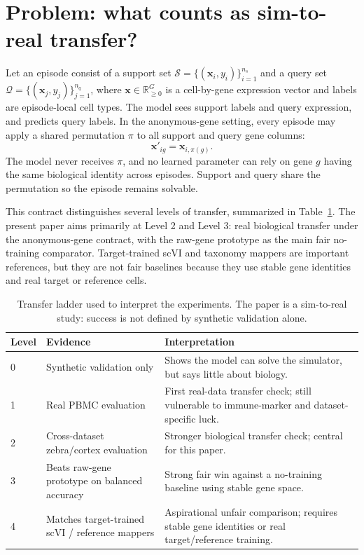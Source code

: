 \documentclass{article}
\newcommand{\R}{\mathbb{R}}
\begin{document}
\section{Problem: what counts as sim-to-real transfer?}

Let an episode consist of a support set \(\mathcal{S}=\{(\mathbf{x}_i,y_i)\}_{i=1}^{n_s}\) and a query set \(\mathcal{Q}=\{(\mathbf{x}_j,y_j)\}_{j=1}^{n_q}\), where \(\mathbf{x}\in\R_{\ge 0}^{G}\) is a cell-by-gene expression vector and labels are episode-local cell types. The model sees support labels and query expression, and predicts query labels. In the anonymous-gene setting, every episode may apply a shared permutation \(\pi\) to all support and query gene columns:
\begin{equation}
    \mathbf{x}'_{ig}=\mathbf{x}_{i,\pi(g)}.
\end{equation}
The model never receives \(\pi\), and no learned parameter can rely on gene \(g\) having the same biological identity across episodes. Support and query share the permutation so the episode remains solvable.

This contract distinguishes several levels of transfer, summarized in Table~\ref{tab:transfer_ladder}. The present paper aims primarily at Level 2 and Level 3: real biological transfer under the anonymous-gene contract, with the raw-gene prototype as the main fair no-training comparator. Target-trained scVI and taxonomy mappers are important references, but they are not fair baselines because they use stable gene identities and real target or reference cells.

\begin{table}[t]
\centering
\small
\caption{Transfer ladder used to interpret the experiments. The paper is a sim-to-real study: success is not defined by synthetic validation alone.}
\label{tab:transfer_ladder}
\begin{tabularx}{\textwidth}{@{}p{}p{}X@{}}
\toprule
\textbf{Level} & \textbf{Evidence} & \textbf{Interpretation} \\
\midrule
0 & Synthetic validation only & Shows the model can solve the simulator, but says little about biology. \\
1 & Real PBMC evaluation & First real-data transfer check; still vulnerable to immune-marker and dataset-specific luck. \\
2 & Cross-dataset zebra/cortex evaluation & Stronger biological transfer check; central for this paper. \\
3 & Beats raw-gene prototype on balanced accuracy & Strong fair win against a no-training baseline using stable gene space. \\
4 & Matches target-trained scVI / reference mappers & Aspirational unfair comparison; requires stable gene identities or real target/reference training. \\
\bottomrule
\end{tabularx}
\end{table}
\end{document}
